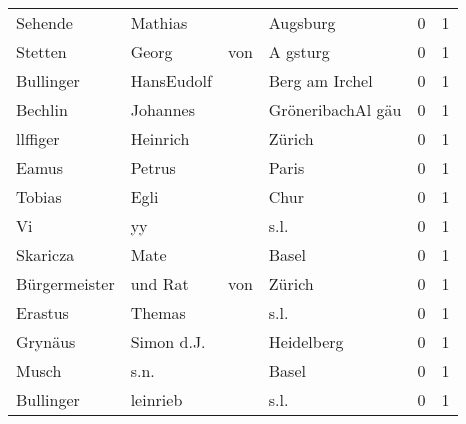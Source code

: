 \begin{center}
\begin{tiny}
\begin{longtabu}{llllrr}
                  Sehende &                            Mathias &             &                                    Augsburg &          0 &         1 \\
                  Stetten &                              Georg &         von &                                    A gsturg &          0 &         1 \\
                Bullinger &                         HansEudolf &             &                              Berg am Irchel &          0 &         1 \\
                  Bechlin &                           Johannes &             &                           GröneribachAl gäu &          0 &         1 \\
                 llffiger &                           Heinrich &             &                                      Zürich &          0 &         1 \\
                    Eamus &                             Petrus &             &                                       Paris &          0 &         1 \\
                   Tobias &                               Egli &             &                                        Chur &          0 &         1 \\
                       Vi &                                 yy &             &                                        s.l. &          0 &         1 \\
                 Skaricza &                               Mate &             &                                       Basel &          0 &         1 \\
            Bürgermeister &                            und Rat &         von &                                      Zürich &          0 &         1 \\
                  Erastus &                             Themas &             &                                        s.l. &          0 &         1 \\
                  Grynäus &                         Simon d.J. &             &                                  Heidelberg &          0 &         1 \\
                    Musch &                               s.n. &             &                                       Basel &          0 &         1 \\
                Bullinger &                           leinrieb &             &                                        s.l. &          0 &         1 \\

\end{longtabu}
\end{tiny}
\end{center}
